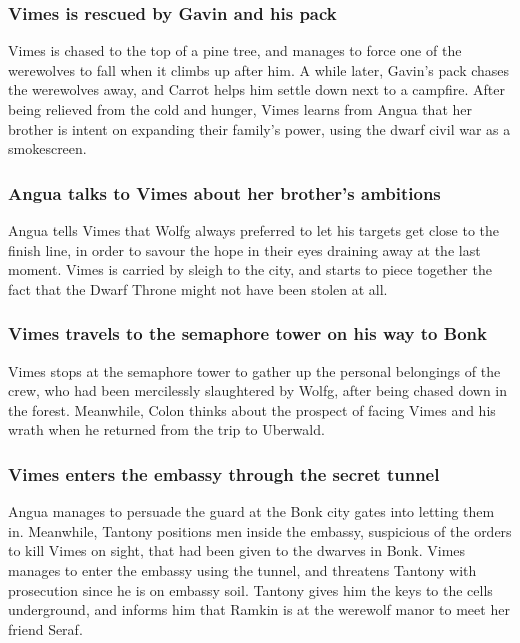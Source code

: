 \subsubsection{\Gls{Vimes} is rescued by \Gls{Gavin} and his pack}
\Gls{Vimes} is chased to the top of a pine tree, and manages to force one of the werewolves to fall
when it climbs up after him. A while later, \Gls{Gavin}'s pack chases the werewolves away, and
\Gls{Carrot} helps him settle down next to a campfire. After being relieved from the cold and
hunger, \Gls{Vimes} learns from \Gls{Angua} that her brother is intent on expanding their family's
power, using the dwarf civil war as a smokescreen.

\subsubsection{\Gls{Angua} talks to \Gls{Vimes} about her brother's ambitions}
\Gls{Angua} tells \Gls{Vimes} that \Gls{Wolfg} always preferred to let his targets get close to
the finish line, in order to savour the hope in their eyes draining away at the last moment.
\Gls{Vimes} is carried by sleigh to the city, and starts to piece together the fact that the Dwarf
Throne might not have been stolen at all.

\subsubsection{\Gls{Vimes} travels to the semaphore tower on his way to Bonk}
\Gls{Vimes} stops at the semaphore tower to gather up the personal belongings of the crew, who had
been mercilessly slaughtered by \Gls{Wolfg}, after being chased down in the forest. Meanwhile,
\Gls{Colon} thinks about the prospect of facing \Gls{Vimes} and his wrath when he returned from the
trip to Uberwald.

\subsubsection{\Gls{Vimes} enters the embassy through the secret tunnel}
\Gls{Angua} manages to persuade the guard at the Bonk city gates into letting them in. Meanwhile,
\Gls{Tantony} positions men inside the embassy, suspicious of the orders to kill \Gls{Vimes} on
sight, that had been given to the dwarves in Bonk. \Gls{Vimes} manages to enter the embassy using
the tunnel, and threatens \Gls{Tantony} with prosecution since he is on embassy soil. \Gls{Tantony}
gives him the keys to the cells underground, and informs him that \Gls{Ramkin} is at the werewolf
manor to meet her friend \Gls{Seraf}.

